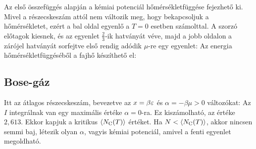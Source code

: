     
    Az első összefüggés alapján a kémiai potenciál hőmérsékletfüggése fejezhető ki. Mivel a részecskeszám attól nem változik meg, hogy bekapcsoljuk a hőmérsékletet, ezért a bal oldal egyenlő a $T=0$ esetben számolttal. A szorzó előtagok kiesnek, és az egyenlet $\frac{2}{3}$-ik hatványát véve, majd a jobb oldalon a zárójel hatványát sorfejtve első rendig adódik $\mu$-re egy egyenlet:
    Az energia hőmérsékletfüggéséből a fajhő készíthető el:
  
  \subsection{Bose-gáz}
   
   Itt az átlagos részecskeszám, bevezetve az $x=\beta\varepsilon$ és $\alpha=-\beta\mu>0$ változókat:
   Az $I$ integrálnak van egy maximális értéke $\alpha=0$-ra. Ez kiszámolható, az értéke $2,613$. Ekkor kapjuk a kritikus $\left\langle N_\text{C}(T)\right\rangle$ értéket. Ha $N<\left\langle N_\text{C}(T)\right\rangle$, akkor nincsen semmi baj, létezik olyan $\alpha$, vagyis kémiai potenciál, amivel a fenti egyenlet megoldható. 
   
